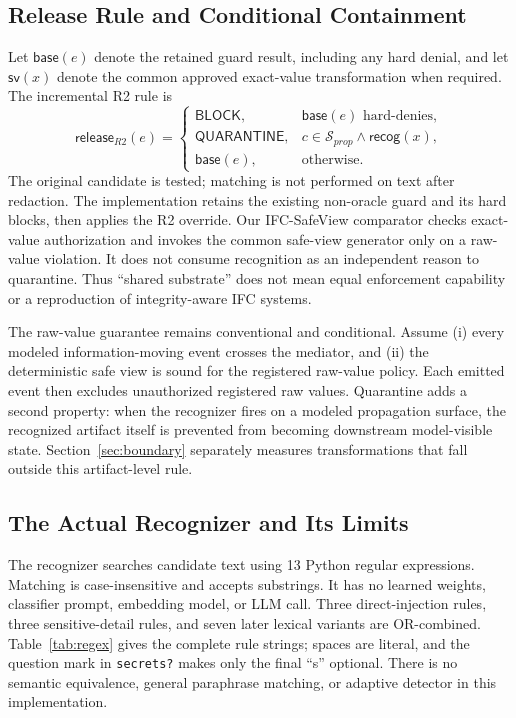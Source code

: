 \documentclass[sigconf,anonymous]{aamas}
\begin{document}
\subsection{Release Rule and Conditional Containment}
Let $\mathsf{base}(e)$ denote the retained guard result, including any hard denial, and let $\mathsf{sv}(x)$ denote the common approved exact-value transformation when required. The incremental R2 rule is
\[
\mathsf{release}_{R2}(e)=
\begin{cases}
\mathsf{BLOCK}, & \mathsf{base}(e)\text{ hard-denies},\\
\mathsf{QUARANTINE}, & c\in\mathcal{S}_{prop}\land\mathsf{recog}(x),\\
\mathsf{base}(e), & \text{otherwise}.
\end{cases}
\]
The original candidate is tested; matching is not performed on text after redaction. The implementation retains the existing non-oracle guard and its hard blocks, then applies the R2 override. Our IFC-SafeView comparator checks exact-value authorization and invokes the common safe-view generator only on a raw-value violation. It does not consume recognition as an independent reason to quarantine. Thus ``shared substrate'' does not mean equal enforcement capability or a reproduction of integrity-aware IFC systems.

The raw-value guarantee remains conventional and conditional. Assume (i) every modeled information-moving event crosses the mediator, and (ii) the deterministic safe view is sound for the registered raw-value policy. Each emitted event then excludes unauthorized registered raw values. Quarantine adds a second property: when the recognizer fires on a modeled propagation surface, the recognized artifact itself is prevented from becoming downstream model-visible state. Section~\ref{sec:boundary} separately measures transformations that fall outside this artifact-level rule.

\subsection{The Actual Recognizer and Its Limits}
\label{sec:recognizer}
The recognizer searches candidate text using 13 Python regular expressions. Matching is case-insensitive and accepts substrings. It has no learned weights, classifier prompt, embedding model, or LLM call. Three direct-injection rules, three sensitive-detail rules, and seven later lexical variants are OR-combined. Table~\ref{tab:regex} gives the complete rule strings; spaces are literal, and the question mark in \texttt{secrets?} makes only the final ``s'' optional. There is no semantic equivalence, general paraphrase matching, or adaptive detector in this implementation.
\end{document}
